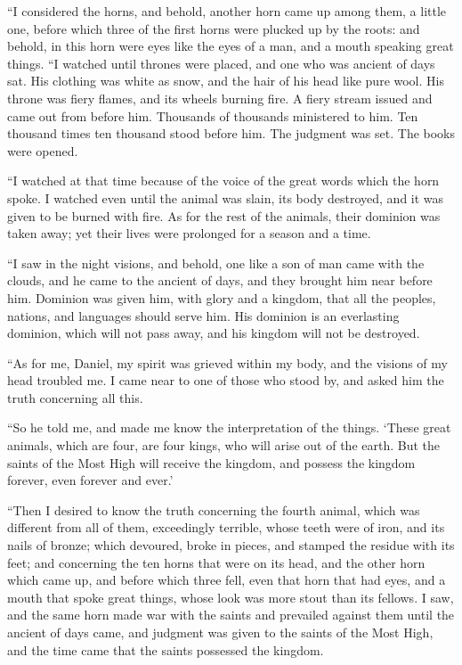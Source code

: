  ``I considered the horns, and behold, another horn came
up among them, a little one, before which three of the first horns were
plucked up by the roots: and behold, in this horn were eyes like the
eyes of a man, and a mouth speaking great things.  ``I
watched until thrones were placed, and one who was ancient of days sat.
His clothing was white as snow, and the hair of his head like pure wool.
His throne was fiery flames, and its wheels burning fire.
 A fiery stream issued and came out from before him.
Thousands of thousands ministered to him. Ten thousand times ten
thousand stood before him. The judgment was set. The books were opened.

 ``I watched at that time because of the voice of the
great words which the horn spoke. I watched even until the animal was
slain, its body destroyed, and it was given to be burned with fire.
 As for the rest of the animals, their dominion was taken
away; yet their lives were prolonged for a season and a time.

 ``I saw in the night visions, and behold, one like a son
of man came with the clouds, and he came to the ancient of days, and
they brought him near before him.  Dominion was given
him, with glory and a kingdom, that all the peoples, nations, and
languages should serve him. His dominion is an everlasting dominion,
which will not pass away, and his kingdom will not be destroyed.

 ``As for me, Daniel, my spirit was grieved within my
body, and the visions of my head troubled me.  I came
near to one of those who stood by, and asked him the truth concerning
all this.

``So he told me, and made me know the interpretation of the things.
 `These great animals, which are four, are four kings,
who will arise out of the earth.  But the saints of the
Most High will receive the kingdom, and possess the kingdom forever,
even forever and ever.'

 ``Then I desired to know the truth concerning the fourth
animal, which was different from all of them, exceedingly terrible,
whose teeth were of iron, and its nails of bronze; which devoured, broke
in pieces, and stamped the residue with its feet;  and
concerning the ten horns that were on its head, and the other horn which
came up, and before which three fell, even that horn that had eyes, and
a mouth that spoke great things, whose look was more stout than its
fellows.  I saw, and the same horn made war with the
saints and prevailed against them  until the ancient of
days came, and judgment was given to the saints of the Most High, and
the time came that the saints possessed the kingdom.

